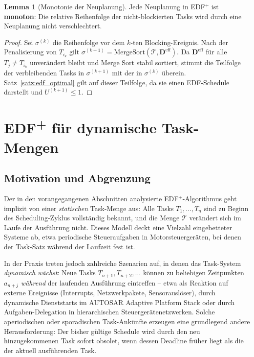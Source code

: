 ﻿\documentclass[a4paper,12pt]{article}
\theoremstyle{definition}
\newtheorem{lemma}{Lemma}
\begin{document}
	\begin{lemma}[Monotonie der Neuplanung]
		Jede Neuplanung in EDF$^+$ ist \textbf{monoton}: Die relative Reihenfolge der
		nicht-blockierten Tasks wird durch eine Neuplanung nicht verschlechtert.
	\end{lemma}

	\begin{proof}
		Sei $\sigma^{(k)}$ die Reihenfolge vor dem $k$-ten Blocking-Ereignis. Nach der
		Penalisierung von $T_{i_k}$ gilt
		$\sigma^{(k+1)} = \mathrm{MergeSort}(\mathcal{T}, \mathbf{D}^{\text{eff}})$.
		Da $\mathbf{D}^{\text{eff}}$ für alle $T_j \neq T_{i_k}$ unverändert bleibt
		und Merge Sort stabil sortiert, stimmt die Teilfolge der verbleibenden Tasks in
		$\sigma^{(k+1)}$ mit der in $\sigma^{(k)}$ überein. Satz~\ref{satz:edf_optimal}
		gilt auf dieser Teilfolge, da sie einen EDF-Schedule darstellt und
		$U^{(k+1)} \le 1$.
	\end{proof}

	\section{EDF\textsuperscript{+} für dynamische Task-Mengen}
	\label{sec:dynamisch}

	\subsection{Motivation und Abgrenzung}

	Der in den vorangegangenen Abschnitten analysierte EDF$^+$-Algorithmus geht implizit
	von einer \emph{statischen} Task-Menge aus: Alle Tasks $T_1, \ldots, T_n$ sind zu Beginn
	des Scheduling-Zyklus vollständig bekannt, und die Menge $\mathcal{T}$ verändert sich
	im Laufe der Ausführung nicht. Dieses Modell deckt eine Vielzahl eingebetteter
	Systeme ab, etwa periodische Steueraufgaben in Motorsteuergeräten, bei denen der
	Task-Satz während der Laufzeit fest ist.

	In der Praxis treten jedoch zahlreiche Szenarien auf, in denen das Task-System
	\emph{dynamisch wächst}: Neue Tasks $T_{n+1}, T_{n+2}, \ldots$ können zu
	beliebigen Zeitpunkten $a_{n+j}$ \emph{während} der laufenden Ausführung eintreffen
	-- etwa als Reaktion auf externe Ereignisse (Interrupts, Netzwerkpakete, Sensorauslöser),
	durch dynamische Dienststarts im AUTOSAR Adaptive Platform Stack oder durch
	Aufgaben-Delegation in hierarchischen Steuergerätenetzwerken. Solche aperiodischen
	oder sporadischen Task-Ankünfte erzeugen eine grundlegend andere Herausforderung:
	Der bisher gültige Schedule wird durch den neu hinzugekommenen Task sofort obsolet,
	wenn dessen Deadline früher liegt als die der aktuell ausführenden Task.
\end{document}
